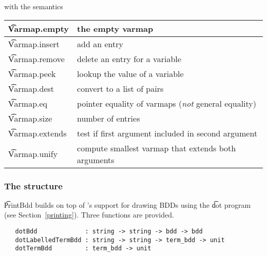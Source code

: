 with the semantics

\bigskip

\begin{tabular}{|l|l|} \hline
\t{Varmap.empty} &    the empty varmap \\ \hline
\t{Varmap.insert} &   add an entry \\ \hline
\t{Varmap.remove} &   delete an entry for a variable \\ \hline
\t{Varmap.peek} &     lookup the value of a variable \\ \hline
\t{Varmap.dest} &     convert to a list of pairs \\ \hline
\t{Varmap.eq} &       pointer equality of varmaps ({\it not} general equality) \\ \hline
\t{Varmap.size} &     number of entries \\ \hline
\t{Varmap.extends} &  test if first argument included in second argument\\ \hline
\t{Varmap.unify} &  compute smallest varmap that extends both arguments\\ \hline
\end{tabular}

\subsubsection{The structure }\label{PrintBdd}

\t{PrintBdd} builds on top of \Muddy's support for drawing BDDs using the \t{dot}
program (see Section~\ref{printing}). Three functions are provided.

\begin{verbatim}
   dotBdd             : string -> string -> bdd -> bdd
   dotLabelledTermBdd : string -> string -> term_bdd -> unit
   dotTermBdd         : term_bdd -> unit
\end{verbatim}

